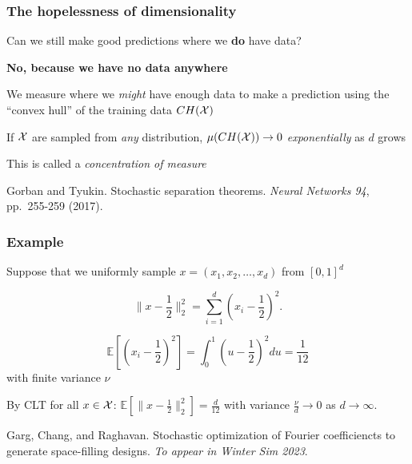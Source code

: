 \documentclass[aspectratio=169]{beamer}
\begin{document}
\begin{frame}
\frametitle{The hopelessness of dimensionality}

Can we still make good predictions where we {\bf do} have data?

\bigskip
\pause

{\bf No, because we have no data anywhere}

\bigskip

We measure where we {\sl might} have enough data to make a prediction
using the ``convex hull'' of the training data $CH({\cal X})$

\bigskip
\pause

If ${\cal X}$ are sampled from {\sl any} distribution,
$\mu(CH({\cal X})) \rightarrow 0$ {\sl exponentially} as $d$ grows

\bigskip

This is called a {\sl concentration of measure}

\vfill

{\tiny Gorban and Tyukin.
Stochastic separation theorems.
{\sl Neural Networks 94}, pp.~255-259 (2017).}

\end{frame}

\begin{frame}
\frametitle{Example}

Suppose that we uniformly sample $x = (x_1, x_2, \ldots, x_d)$ from $[0, 1]^d$

\bigskip

$$
\|x - \frac{1}{2}\|_2^2 = \sum_{i=1}^d{(x_i - \frac{1}{2})^2}.
$$

$$
\mathbb{E}\left[ \left(x_i - \frac{1}{2}\right)^2 \right]
= \int_{0}^1 \left(u - \frac{1}{2}\right)^2 du
= \frac{1}{12}
$$
with finite variance $\nu$

\bigskip

By CLT for all $x \in {\cal X}$:
$\mathbb{E}[\|x - \frac{1}{2}\|_2^2] = \frac{d}{12}$
with variance $\frac{\nu}{d}\rightarrow 0$ as $d\rightarrow\infty$.

\vfill

{\tiny Garg, Chang, and Raghavan.
Stochastic optimization of Fourier coefficiencts to generate space-filling designs.
{\sl To appear in Winter Sim 2023}.}

\end{frame}
\end{document}
